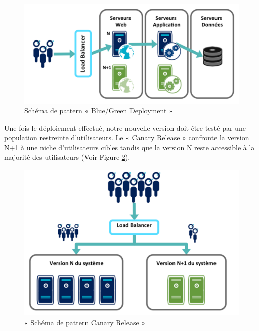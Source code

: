 \documentclass{report}
\begin{document}
          \begin{figure}
            \begin{center}
              \includegraphics[scale=0.7]{images/BlueGreenDeployment.png}
            \end{center}
            \caption{Schéma de pattern « Blue/Green Deployment »}
            \label{BlueGreen}
          \end{figure}

          Une fois le déploiement effectué, notre nouvelle version doit être testé par une population restreinte d’utilisateurs. Le « Canary Release » confronte la version N+1 à une niche d’utilisateurs cibles tandis que la version N reste accessible à la majorité des utilisateurs (Voir Figure \ref{CanaryRelease}).\\

          \begin{figure}
            \begin{center}
              \includegraphics[scale=0.6]{images/CanaryRelease.png}
            \end{center}
            \caption{« Schéma de pattern Canary Release »}
            \label{CanaryRelease}
          \end{figure}
\end{document}
